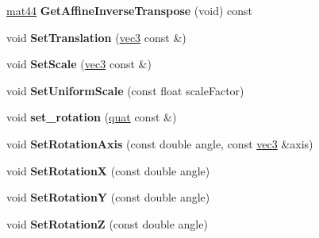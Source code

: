 \begin{DoxyCompactItemize}
\item 
\hypertarget{classmath_1_1mat44_a77f73bc06dfc2d10ec6ae41f87a6a3a3}{
\hyperlink{classmath_1_1mat44}{mat44} {\bfseries GetAffineInverseTranspose} (void) const }
\label{classmath_1_1mat44_a77f73bc06dfc2d10ec6ae41f87a6a3a3}

\item 
\hypertarget{classmath_1_1mat44_ab845457a5f506735868a13f8b5d94131}{
void {\bfseries SetTranslation} (\hyperlink{classmath_1_1vec3}{vec3} const \&)}
\label{classmath_1_1mat44_ab845457a5f506735868a13f8b5d94131}

\item 
\hypertarget{classmath_1_1mat44_acfccea74c15c3322bd93110e37dfe691}{
void {\bfseries SetScale} (\hyperlink{classmath_1_1vec3}{vec3} const \&)}
\label{classmath_1_1mat44_acfccea74c15c3322bd93110e37dfe691}

\item 
\hypertarget{classmath_1_1mat44_a12fc9924aca6a635a573e6e458afe63c}{
void {\bfseries SetUniformScale} (const float scaleFactor)}
\label{classmath_1_1mat44_a12fc9924aca6a635a573e6e458afe63c}

\item 
\hypertarget{classmath_1_1mat44_ac6775d1354a81c8995d64b82f5868299}{
void {\bfseries set\_\-rotation} (\hyperlink{classmath_1_1quat}{quat} const \&)}
\label{classmath_1_1mat44_ac6775d1354a81c8995d64b82f5868299}

\item 
\hypertarget{classmath_1_1mat44_a511cc92d50ec4b41b16977d818621b40}{
void {\bfseries SetRotationAxis} (const double angle, const \hyperlink{classmath_1_1vec3}{vec3} \&axis)}
\label{classmath_1_1mat44_a511cc92d50ec4b41b16977d818621b40}

\item 
\hypertarget{classmath_1_1mat44_a07655baec529c4ce7d84b7081fe2e6e0}{
void {\bfseries SetRotationX} (const double angle)}
\label{classmath_1_1mat44_a07655baec529c4ce7d84b7081fe2e6e0}

\item 
\hypertarget{classmath_1_1mat44_a16d427e41f65475295c35e3de9665d7b}{
void {\bfseries SetRotationY} (const double angle)}
\label{classmath_1_1mat44_a16d427e41f65475295c35e3de9665d7b}

\item 
\hypertarget{classmath_1_1mat44_a2f556db5b6e18b4e6d01c473bd27b340}{
void {\bfseries SetRotationZ} (const double angle)}
\label{classmath_1_1mat44_a2f556db5b6e18b4e6d01c473bd27b340}


\end{DoxyCompactItemize}
